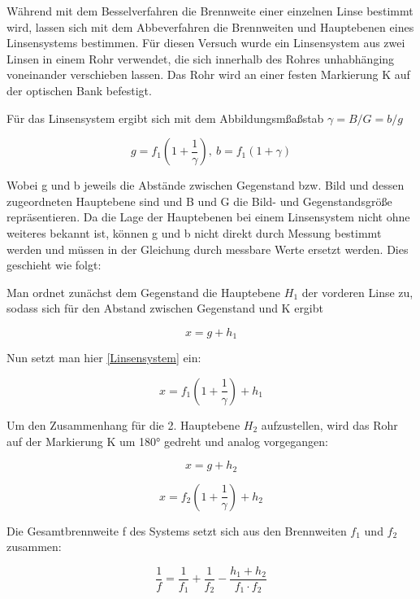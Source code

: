 Während mit dem Besselverfahren die Brennweite einer einzelnen Linse bestimmt wird, lassen sich mit dem Abbeverfahren die Brennweiten und Hauptebenen eines Linsensystems bestimmen.
Für diesen Versuch wurde ein Linsensystem aus zwei Linsen in einem Rohr verwendet, die sich innerhalb des Rohres unhabhänging voneinander verschieben lassen.
Das Rohr wird an einer festen Markierung K auf der optischen Bank befestigt.

Für das Linsensystem ergibt sich mit dem Abbildungsmßaßstab $\gamma = B/G = b/g$

\begin{equation} \label{Linsensystem}
    g = f_1(1 + \frac{1}{\gamma}),\ b = f_1(1+\gamma)
\end{equation}

Wobei g und b jeweils die Abstände zwischen Gegenstand bzw. Bild und dessen zugeordneten Hauptebene sind und B und G die Bild- und Gegenstandsgröße repräsentieren.
Da die Lage der Hauptebenen bei einem Linsensystem nicht ohne weiteres bekannt ist, können g und b nicht direkt durch Messung bestimmt werden und müssen in der Gleichung
durch messbare Werte ersetzt werden.
Dies geschieht wie folgt:

Man ordnet zunächst dem Gegenstand die Hauptebene $H_1$ der vorderen Linse zu, sodass sich für den Abstand zwischen Gegenstand und K ergibt

\begin{equation} \label{x1}
    x = g + h_1
\end{equation}

Nun setzt man hier \ref{Linsensystem} ein:

\begin{equation} \label{x2}
    x = f_1(1 + \frac{1}{\gamma}) + h_1
\end{equation}

Um den Zusammenhang für die 2. Hauptebene $H_2$ aufzustellen, wird das Rohr auf der Markierung K um 180° gedreht und analog vorgegangen:

\begin{equation} \label{x2}
    x = g + h_2
\end{equation}

\begin{equation} \label{x2}
    x = f_2(1 + \frac{1}{\gamma}) + h_2
\end{equation}

Die Gesamtbrennweite f des Systems setzt sich aus den Brennweiten $f_1$ und $f_2$ zusammen:

\begin{equation}
    \frac{1}{f} = \frac{1}{f_1} + \frac{1}{f_2} - \frac{h_1 + h_2}{f_1 \cdot f_2}
\end{equation}

